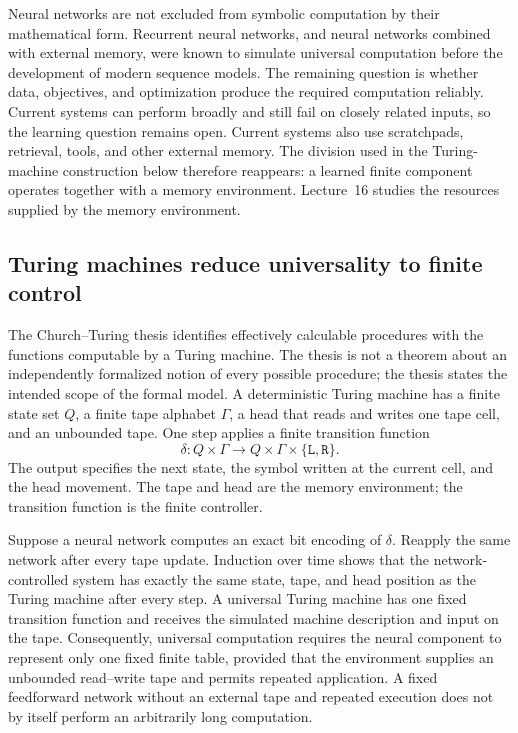 \documentclass[11pt,twoside]{article}
\theoremstyle{definition}
\theoremstyle{remark}
\begin{document}
Neural networks are not excluded from symbolic computation by their
mathematical form. Recurrent neural networks, and neural networks combined
with external memory, were known to simulate universal computation before the
development of modern sequence models. The remaining question is whether
data, objectives, and optimization produce the required computation reliably.
Current systems can perform broadly and still fail on closely related inputs,
so the learning question remains open. Current systems also use scratchpads,
retrieval, tools, and other external memory. The division used in the
Turing-machine construction below therefore reappears: a learned finite
component operates together with a memory environment. Lecture~16 studies the
resources supplied by the memory environment.

\subsection{Turing machines reduce universality to finite control}

The Church--Turing thesis identifies effectively calculable procedures with
the functions computable by a Turing machine. The thesis is not a theorem
about an independently formalized notion of every possible procedure; the
thesis states the intended scope of the formal model. A deterministic Turing
machine
has a finite state set $Q$, a finite tape alphabet $\Gamma$, a head that reads
and writes one tape cell, and an unbounded tape. One step applies a finite
transition function
\begin{equation}
 \delta:Q\times\Gamma
 \longrightarrow Q\times\Gamma\times\{\mathtt L,\mathtt R\}.
 \label{eq:turing-transition}
\end{equation}
The output specifies the next state, the symbol written at the current cell,
and the head movement. The tape and head are the memory environment; the
transition function is the finite controller.

Suppose a neural network computes an exact bit encoding of $\delta$. Reapply
the same network after every tape update. Induction over time shows that the
network-controlled system has exactly the same state, tape, and head position
as the Turing machine after every step. A universal Turing machine has one
fixed transition function and receives the simulated machine description and
input on the tape. Consequently, universal computation requires the neural component
to represent only one fixed finite table, provided that the environment
supplies an unbounded read--write tape and permits repeated application. A
fixed feedforward network without an external tape and repeated execution does
not by itself perform an arbitrarily long computation.
\end{document}
